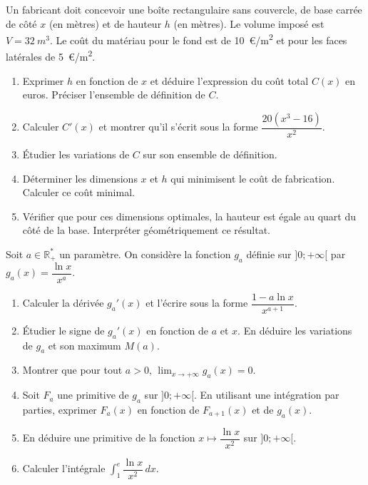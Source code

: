 \documentclass[11pt]{article}
\begin{document}
\begin{exercice}
Un fabricant doit concevoir une boîte rectangulaire sans couvercle, de base carrée de côté $x$ (en mètres) et de hauteur $h$ (en mètres). Le volume imposé est $V = \SI{32}{m^3}$. Le coût du matériau pour le fond est de \SI{10}{€/m^2} et pour les faces latérales de \SI{5}{€/m^2}.
\begin{enumerate}
    \item Exprimer $h$ en fonction de $x$ et déduire l'expression du coût total $C(x)$ en euros. Préciser l'ensemble de définition de $C$.
    \item Calculer $C'(x)$ et montrer qu'il s'écrit sous la forme $\dfrac{20(x^3 - 16)}{x^2}$.
    \item Étudier les variations de $C$ sur son ensemble de définition.
    \item Déterminer les dimensions $x$ et $h$ qui minimisent le coût de fabrication. Calculer ce coût minimal.
    \item Vérifier que pour ces dimensions optimales, la hauteur est égale au quart du côté de la base. Interpréter géométriquement ce résultat.
\end{enumerate}
\end{exercice}

\begin{exercice}
Soit $a \in \mathbb{R}^*_+$ un paramètre. On considère la fonction $g_a$ définie sur $]0; +\infty[$ par $g_a(x) = \dfrac{\ln x}{x^a}$.
\begin{enumerate}
    \item Calculer la dérivée $g_a'(x)$ et l'écrire sous la forme $\dfrac{1 - a\ln x}{x^{a+1}}$.
    \item Étudier le signe de $g_a'(x)$ en fonction de $a$ et $x$. En déduire les variations de $g_a$ et son maximum $M(a)$.
    \item Montrer que pour tout $a > 0$, $\displaystyle\lim_{x \to +\infty} g_a(x) = 0$.
    \item Soit $F_a$ une primitive de $g_a$ sur $]0; +\infty[$. En utilisant une intégration par parties, exprimer $F_a(x)$ en fonction de $F_{a+1}(x)$ et de $g_a(x)$.
    \item En déduire une primitive de la fonction $x \mapsto \dfrac{\ln x}{x^2}$ sur $]0; +\infty[$.
    \item Calculer l'intégrale $\displaystyle\int_1^e \dfrac{\ln x}{x^2}\,dx$.
\end{enumerate}
\end{exercice}
\end{document}
